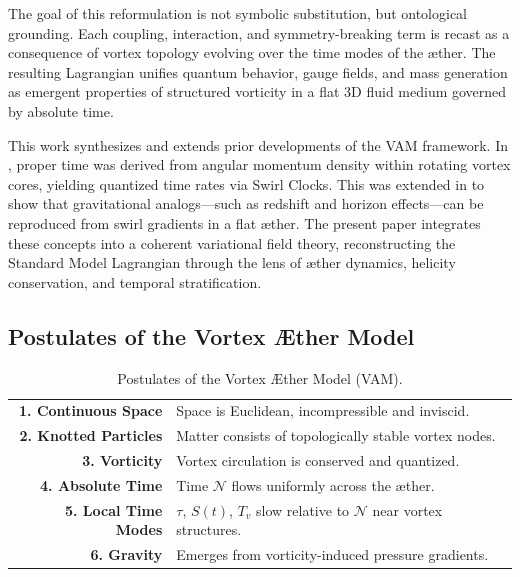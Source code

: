 \documentclass[12pt]{article}
\begin{document}
The goal of this reformulation is not symbolic substitution, but ontological grounding. Each coupling, interaction, and symmetry-breaking term is recast as a consequence of vortex topology evolving over the time modes of the æther. The resulting Lagrangian unifies quantum behavior, gauge fields, and mass generation as emergent properties of structured vorticity in a flat 3D fluid medium governed by absolute time.

This work synthesizes and extends prior developments of the VAM framework. In \cite{iskandarani2025timedilation}, proper time was derived from angular momentum density within rotating vortex cores, yielding quantized time rates via Swirl Clocks. This was extended in \cite{iskandarani2025swirlgravity} to show that gravitational analogs—such as redshift and horizon effects—can be reproduced from swirl gradients in a flat æther. The present paper integrates these concepts into a coherent variational field theory, reconstructing the Standard Model Lagrangian through the lens of æther dynamics, helicity conservation, and temporal stratification.

\subsection*{Postulates of the Vortex Æther Model}

\begin{table}[h!]
    \centering
    \begin{tabular}{rl}
        \hline
        \textbf{1. Continuous Space} & Space is Euclidean, incompressible and inviscid. \\
        \textbf{2. Knotted Particles} & Matter consists of topologically stable vortex nodes. \\
        \textbf{3. Vorticity} & Vortex circulation is conserved and quantized. \\
        \textbf{4. Absolute Time} & Time $\mathcal{N}$ flows uniformly across the æther. \\
        \textbf{5. Local Time Modes} & $\tau$, $S(t)$, $T_v$ slow relative to $\mathcal{N}$ near vortex structures. \\
        \textbf{6. Gravity} & Emerges from vorticity-induced pressure gradients. \\
        \hline
    \end{tabular}
    \caption{Postulates of the Vortex Æther Model (VAM).}
    \label{tab:postulates}
\end{table}
\end{document}

